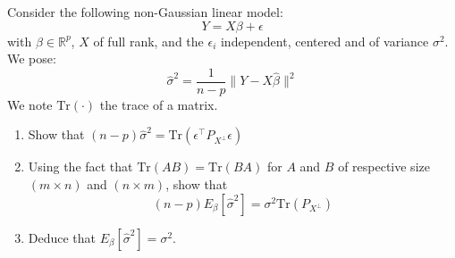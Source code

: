 
\begin{exercise}
Consider the following non-Gaussian linear model:
\[Y = X\beta + \epsilon\]
with \(\beta \in \mathbb{R}^p\), \(X\) of full rank, and the \(\epsilon_i\) independent, centered and of variance \(\sigma^2\). We pose:
\[\hat{\sigma}^2 = \frac{1}{n - p} \|Y - X\hat{\beta}\|^2\]
We note \(\text{Tr}(\cdot)\) the trace of a matrix.

\begin{enumerate}
    \item Show that \((n - p)\hat{\sigma}^2 = \text{Tr}(\epsilon^{\top}P_{X^{\perp}} \epsilon)\)

    \item Using the fact that \(\text{Tr}(AB) = \text{Tr}(BA)\) for \(A\) and \(B\) of respective size \((m \times n)\) and \((n \times m)\), show that
    \[(n - p)E_{\beta}[\hat{\sigma}^2] = \sigma^2 \text{Tr}(P_{X^{\perp}})\]

    \item Deduce that \(E_{\beta}[\hat{\sigma}^2] = \sigma^2\).
\end{enumerate}
\end{exercise}

